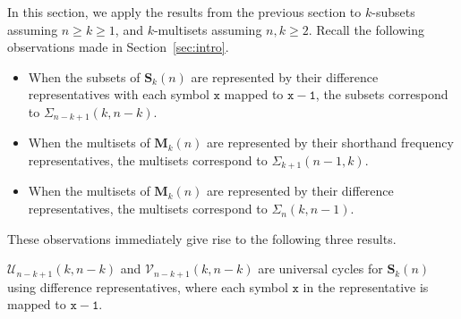 \documentclass[US-letter,USenglish,authorcolumns,autoref]{lipics-v2021}
\renewcommand{\tt} {\mathtt}
\newcommand{\bS}{\mathbf{S}}
\newcommand{\bM}{\mathbf{M}}
\begin{document}
In this section, we apply the results from the previous section to $k$-subsets assuming $n \geq k \geq 1$, and $k$-multisets assuming $n, k \geq 2$.  Recall the following observations made in Section~\ref{sec:intro}.
\begin{itemize}
%
\item When the subsets of $\bS_k(n)$ are represented by their difference representatives with each symbol $\tt{x}$ mapped to $\tt{x{-}1}$, the subsets correspond to $\Sigma_{n-k+1}(k,n-k)$.
\smallskip

%
\item When the multisets of $\bM_k(n)$ are represented by their shorthand frequency representatives, the multisets correspond to $\Sigma_{k+1}(n-1,k)$. \smallskip

%
\item When the multisets of $\bM_k(n)$ are represented by their difference representatives, the multisets correspond to $\Sigma_{n}(k,n-1)$.


\end{itemize}

\noindent
These observations immediately give rise to the following three results. 

\begin{theorem}
$\mathcal{U}_{n-k+1}(k,n-k)$ and $\mathcal{V}_{n-k+1}(k,n-k)$ are universal cycles  
for $\bS_k(n)$ using difference representatives, where each symbol $\tt{x}$ in the representative is mapped to $\tt{x-1}$.  
\end{theorem}
\end{document}
